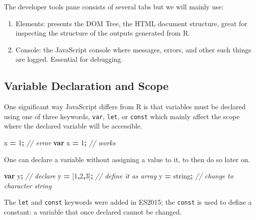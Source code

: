 \documentclass[
  10pt,
]{krantz}
\makeatletter
\newenvironment{Shaded}{\begin{snugshade}}{\end{snugshade}}
\newcommand{\CommentTok}[1]{\textcolor[rgb]{0.37,0.37,0.37}{\textit{#1}}}
\newcommand{\DecValTok}[1]{\textcolor[rgb]{0.06,0.06,0.06}{#1}}
\newcommand{\KeywordTok}[1]{\textcolor[rgb]{0.27,0.27,0.27}{\textbf{#1}}}
\newcommand{\NormalTok}[1]{#1}
\newcommand{\OperatorTok}[1]{\textcolor[rgb]{0.43,0.43,0.43}{\textbf{#1}}}
\newcommand{\StringTok}[1]{\textcolor[rgb]{0.5,0.5,0.5}{#1}}
\providecommand{\tightlist}{%
  \setlength{\itemsep}{0pt}\setlength{\parskip}{0pt}}
\newenvironment{kframe}{%
\medskip{}
\setlength{\fboxsep}{.8em}
 \def\at@end@of@kframe{}%
 \ifinner\ifhmode%
  \def\at@end@of@kframe{\end{minipage}}%
  \begin{minipage}{\columnwidth}%
 \fi\fi%
 \def\FrameCommand##1{\hskip\@totalleftmargin \hskip-\fboxsep
 \colorbox{shadecolor}{##1}\hskip-\fboxsep
     \hskip-\linewidth \hskip-\@totalleftmargin \hskip\columnwidth}%
 \MakeFramed {\advance\hsize-\width
   \@totalleftmargin\z@ \linewidth\hsize
   \@setminipage}}%
 {\par\unskip\endMakeFramed%
 \at@end@of@kframe}
\renewenvironment{Shaded}{\begin{kframe}}{\end{kframe}}
\makeatother
\begin{document}
The developer tools pane consists of several tabs but we will mainly use:

\begin{enumerate}
\def\labelenumi{\arabic{enumi}.}
\tightlist
\item
  Elements: presents the DOM Tree, the HTML document structure, great for inspecting the structure of the outputs generated from R.
\item
  Console: the JavaScript console where messages, errors, and other such things are logged. Essential for debugging.
\end{enumerate}

\hypertarget{basics-var-scope}{%
\subsection{Variable Declaration and Scope}\label{basics-var-scope}}

One significant way JavaScript differs from R is that variables must be declared using one of three keywords, \texttt{var}, \texttt{let}, or \texttt{const} which mainly affect the scope where the declared variable will be accessible.

\begin{Shaded}
\begin{Highlighting}[]
\NormalTok{x }\OperatorTok{=} \DecValTok{1}\OperatorTok{;} \CommentTok{// error}
\KeywordTok{var}\NormalTok{ x }\OperatorTok{=} \DecValTok{1}\OperatorTok{;} \CommentTok{// works}
\end{Highlighting}
\end{Shaded}

One can declare a variable without assigning a value to it, to then do so later on.

\begin{Shaded}
\begin{Highlighting}[]
\KeywordTok{var}\NormalTok{ y}\OperatorTok{;} \CommentTok{// declare }
\NormalTok{y }\OperatorTok{=}\NormalTok{ [}\DecValTok{1}\OperatorTok{,}\DecValTok{2}\OperatorTok{,}\DecValTok{3}\NormalTok{]}\OperatorTok{;} \CommentTok{// define it as array}
\NormalTok{y }\OperatorTok{=} \StringTok{\textquotesingle{}string\textquotesingle{}}\OperatorTok{;} \CommentTok{// change to character string}
\end{Highlighting}
\end{Shaded}

The \texttt{let} and \texttt{const} keywords were added in ES2015; the \texttt{const} is used to define a constant: a variable that once declared cannot be changed.
\end{document}
